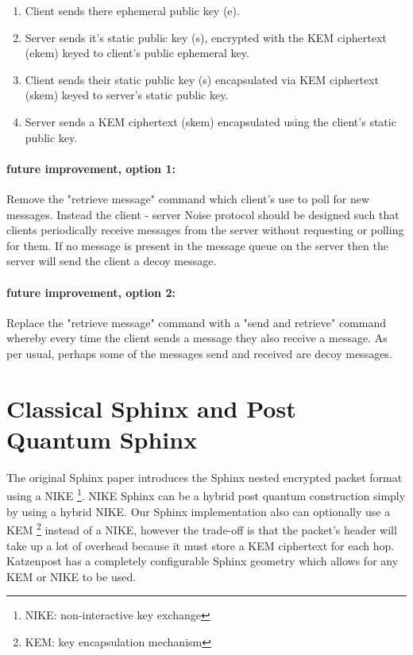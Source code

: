\documentclass{article}
\begin{document}
\vspace{.5cm}

\begin{enumerate}
    \item Client sends there ephemeral public key (e).
    \item Server sends it's static public key (s), encrypted with the KEM ciphertext (ekem) keyed to client's public ephemeral key.
    \item Client sends their static public key (s) encapsulated via KEM ciphertext (skem) keyed to server's static public key.
    \item Server sends a KEM ciphertext (skem) encapsulated using the client's static public key.
\end{enumerate}\bigskip

\vspace{1cm}

\paragraph{future improvement, option 1:}Remove the "retrieve message" command which client's use to poll for new messages. Instead the client - server Noise protocol should be designed such that clients periodically receive messages from the server without requesting or polling for them. If no message is present in the message queue on the server then the server will send the client a decoy message.

\paragraph{future improvement, option 2:}Replace the "retrieve message" command with a "send and retrieve" command whereby every time the client sends a message they also receive a message. As per usual, perhaps some of the messages send and received are decoy messages.


\pagebreak
 
\section{Classical Sphinx and Post Quantum Sphinx}

The original Sphinx paper  introduces the Sphinx nested encrypted packet format
using a NIKE \footnote{NIKE: non-interactive key exchange}. NIKE Sphinx can be a hybrid post quantum construction simply by using a hybrid NIKE.
Our Sphinx implementation also can optionally use a KEM \footnote{KEM: key encapsulation mechanism} instead of a NIKE, however the trade-off is that
the packet's header will take up a lot of overhead because it must store a KEM ciphertext for each hop.
Katzenpost has a completely configurable Sphinx geometry which allows for any KEM or NIKE to be used.
\end{document}
